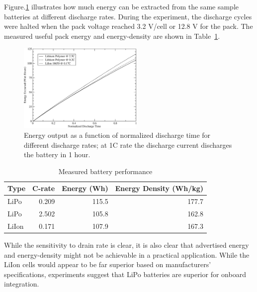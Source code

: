 \documentclass{ifacconf}
\begin{document}
Figure.\ref{fig:Batt_e_vs_t} illustrates how much energy can be extracted
from the same sample batteries at different discharge rates. During the
experiment, the discharge cycles were halted when the pack voltage reached
3.2 V/cell or 12.8 V for the pack. The measured useful pack energy and
energy-density are shown in Table~\ref{Batt_performance}.
\begin{figure}[thbp]
  \centering
  \includegraphics[width=6cm]{Figures/Energy_v_time_mod.eps}
  \caption{Energy output as a function of normalized discharge time for
  different discharge rates; at 1C rate the discharge current discharges
  the battery in 1 hour.}
  \label{fig:Batt_e_vs_t}
\end{figure}
\begin{table}
  \caption{Measured battery performance}
  \centering
  \begin{tabular}{ l | r | r | r }
  Type &C-rate & Energy (Wh) & Energy Density (Wh/kg) \\
  \hline
  LiPo & 0.209 & 115.5 & 177.7 \\
  LiPo & 2.502 & 105.8 & 162.8 \\
  LiIon & 0.171 & 107.9 & 167.3 \\
  \end{tabular}
  \label{Batt_performance}
\end{table}
While the sensitivity to drain rate is clear, it is also clear that
advertised energy and energy-density might not be achievable in a practical
application. While the LiIon cells would appear to be far superior based on
manufacturers' specifications, experiments suggest that LiPo batteries are
superior for onboard integration.
\end{document}
